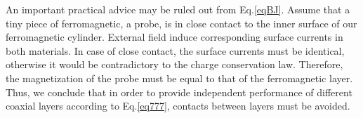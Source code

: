 \documentclass[12pt]{article}
\begin{document}
An important practical advice may be ruled out from Eq.\ref{eqBJ}.
Assume  that  a  tiny piece of ferromagnetic, a probe, is in close contact to the inner
surface of our  ferromagnetic cylinder.  External field induce 
corresponding surface currents in both materials.
In  case of close contact,  the  surface currents must  be  identical, 
otherwise it would  be contradictory to the charge conservation law. Therefore,  
the  magnetization of the probe must  be  equal to that of the  
ferromagnetic layer.
Thus, we  conclude  that  in order to provide  independent performance of 
different coaxial layers according to Eq.\ref{eq777}, contacts between  
layers must  be avoided.






\end{document}
